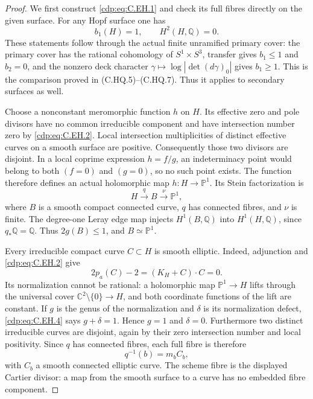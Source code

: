 \begin{proof}
We first construct \eqref{cdp:eq:C.EH.1} and check its full fibres directly
on the given surface. For any Hopf surface one has
\[
                    b_1(H)=1,\qquad H^2(H,\mathbb Q)=0.
\tag{C.EH.2}\label{cdp:eq:C.EH.2}
\]
These statements follow through the actual finite unramified
primary cover: the primary cover has the rational cohomology
of $S^1\times S^3$, transfer gives $b_1\leq1$ and $b_2=0$,
and the nonzero deck character
$\gamma\mapsto\log|\det(d\gamma)_0|$ gives $b_1\geq1$.
This is the comparison proved in (C.HQ.5)--(C.HQ.7).
Thus it applies to secondary surfaces as well.

Choose a nonconstant meromorphic function $h$ on $H$.
Its effective zero and pole divisors have no common
irreducible component and have intersection number zero
by \eqref{cdp:eq:C.EH.2}. Local intersection multiplicities of distinct
effective curves on a smooth surface are positive.
Consequently those two divisors are disjoint. In a local
coprime expression $h=f/g$, an indeterminacy point would
belong to both $(f=0)$ and $(g=0)$, so no such point exists.
The function therefore defines an actual holomorphic map
$h:H\to\mathbb P^1$. Its Stein factorization is
\[
               H\xrightarrow{q}B\xrightarrow{\nu}\mathbb P^1,
\tag{C.EH.3}\label{cdp:eq:C.EH.3}
\]
where $B$ is a smooth compact connected curve, $q$ has
connected fibres, and $\nu$ is finite. The degree-one
Leray edge map injects $H^1(B,\mathbb Q)$ into
$H^1(H,\mathbb Q)$, since $q_*\mathbb Q=\mathbb Q$.
Thus $2g(B)\leq1$, and $B\simeq\mathbb P^1$.

Every irreducible compact curve $C\subset H$ is smooth
elliptic. Indeed, adjunction and \eqref{cdp:eq:C.EH.2} give
\[
                 2p_a(C)-2=(K_H+C)\cdot C=0.
\tag{C.EH.4}\label{cdp:eq:C.EH.4}
\]
Its normalization cannot be rational: a holomorphic map
$\mathbb P^1\to H$ lifts through the universal cover
$\mathbb C^2\setminus\{0\}\to H$, and both coordinate
functions of the lift are constant. If $g$ is the genus
of the normalization and $\delta$ is its normalization
defect, \eqref{cdp:eq:C.EH.4} says $g+\delta=1$. Hence $g=1$ and
$\delta=0$. Furthermore two distinct irreducible curves
are disjoint, again by their zero intersection number
and local positivity. Since $q$ has connected fibres,
each full fibre is therefore
\[
                              q^{-1}(b)=m_b C_b,
\tag{C.EH.5}\label{cdp:eq:C.EH.5}
\]
with $C_b$ a smooth connected elliptic curve. The scheme
fibre is the displayed Cartier divisor: a map from the
smooth surface to a curve has no embedded fibre component.


\end{proof}
